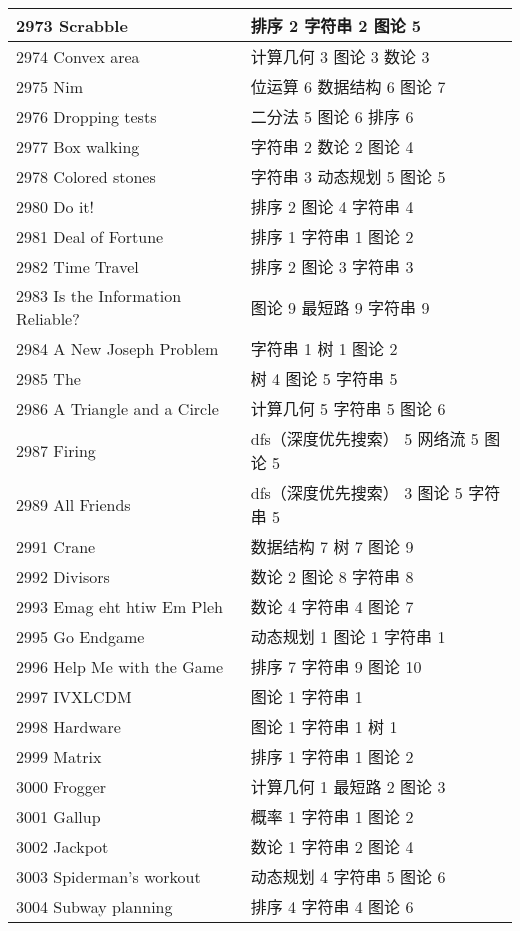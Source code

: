 \begin{longtable}{| p{} | p{} |}
 2973 Scrabble  & 排序 2 字符串 2 图论 5 \\ \hline
 2974 Convex area  & 计算几何 3 图论 3 数论 3 \\ \hline
 2975 Nim  & 位运算 6 数据结构 6 图论 7 \\ \hline
 2976 Dropping tests  & 二分法 5 图论 6 排序 6 \\ \hline
 2977 Box walking  & 字符串 2 数论 2 图论 4 \\ \hline
 2978 Colored stones  & 字符串 3 动态规划 5 图论 5 \\ \hline
 2980 Do it!  & 排序 2 图论 4 字符串 4 \\ \hline
 2981 Deal of Fortune  & 排序 1 字符串 1 图论 2 \\ \hline
 2982 Time Travel  & 排序 2 图论 3 字符串 3 \\ \hline
 2983 Is the Information Reliable?  & 图论 9 最短路 9 字符串 9 \\ \hline
 2984 A New Joseph Problem  & 字符串 1 树 1 图论 2 \\ \hline
 2985 The   & 树 4 图论 5 字符串 5 \\ \hline
 2986 A Triangle and a Circle  & 计算几何 5 字符串 5 图论 6 \\ \hline
 2987 Firing  & dfs（深度优先搜索） 5 网络流 5 图论 5 \\ \hline
 2989 All Friends  & dfs（深度优先搜索） 3 图论 5 字符串 5 \\ \hline
 2991 Crane  & 数据结构 7 树 7 图论 9 \\ \hline
 2992 Divisors  & 数论 2 图论 8 字符串 8 \\ \hline
 2993 Emag eht htiw Em Pleh  & 数论 4 字符串 4 图论 7 \\ \hline
 2995 Go Endgame  & 动态规划 1 图论 1 字符串 1 \\ \hline
 2996 Help Me with the Game  & 排序 7 字符串 9 图论 10 \\ \hline
 2997 IVXLCDM  & 图论 1 字符串 1 \\ \hline
 2998 Hardware  & 图论 1 字符串 1 树 1 \\ \hline
 2999 Matrix  & 排序 1 字符串 1 图论 2 \\ \hline
 3000 Frogger  & 计算几何 1 最短路 2 图论 3 \\ \hline
 3001 Gallup  & 概率 1 字符串 1 图论 2 \\ \hline
 3002 Jackpot  & 数论 1 字符串 2 图论 4 \\ \hline
 3003 Spiderman’s workout  & 动态规划 4 字符串 5 图论 6 \\ \hline
 3004 Subway planning  & 排序 4 字符串 4 图论 6 \\ \hline

\end{longtable}
